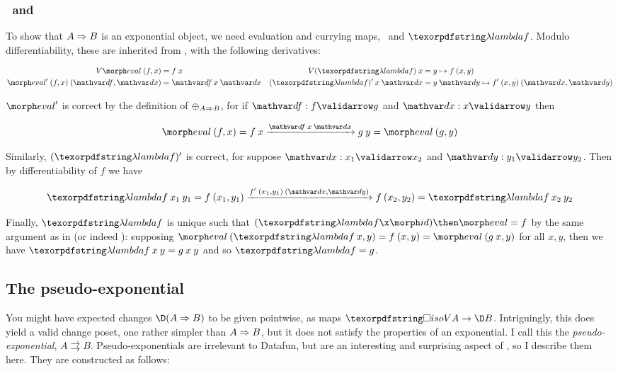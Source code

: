 
\subsubsection{\eval\ and \fn}

To show that $A \Rightarrow B$ is an exponential object, we need evaluation and
currying maps, \eval\ and $\fn f$. Modulo differentiability, these are
inherited from \Poset{}, with the following derivatives:

\begin{align*}
  \vals{\eval} \<(f,x) &= f\<x &
  \vals{(\fn f)} \<x &= y \mapsto f\<(x,y)\\
  \deriv{\eval} \<(f,x) \<(\df,\dx) &= \df \<x \<\dx &
  \deriv{(\fn f)} \<x \<\dx &= y\<\dy \mapsto \deriv f \<(x,y) \<(\dx,\dy)
\end{align*}

\noindent
$\deriv{\eval}$ is correct by the definition of ${\mathbin{\oplus}}_{A \Rightarrow B}$, for if
$\valid\df f g$ and $\valid\dx x y$ then

\nopagebreak[2]
\[ \eval\<(f,x) = {f\<x} \longvalidarrow{\df\<x\<\dx} {g\<y} = \eval\<(g,y) \]

\noindent
Similarly, \(\deriv{(\fn f)}\) is correct, for suppose $\valid\dx {x_1}{x_2}$
and $\valid\dy{y_1}{y_2}$. Then by differentiability of $f$ we have

\nopagebreak[2]
\[ \fn f \<x_1 \<y_1 =
f\<(x_1,y_1) \longvalidarrow{\deriv f \<(x_1,y_1) \<(\dx,\dy)} f\<(x_2,y_2)
= \fn f \<x_2 \<y_2
\]

\noindent
Finally, $\fn f$ is unique such that $(\fn f \x \id) \then \eval = f$ by the
same argument as in \Poset{} (or indeed ): supposing $\eval \<(\fn f
\<x, y) = f\<(x,y) = \eval\<(g\<x,y)$ for all $x,y$, then we have $\fn f \<x \<
y = g \<x \<y$ and so $\fn f = g$.


\subsection{The pseudo-exponential}

\newcommand\pseudoexp{\rightrightarrows}

You might have expected changes $\chgs{(\expO A B)}$ to be given pointwise, as
maps $\isof{\vals A} \to \chgs B$. Intriguingly, this does yield a valid change
poset, one rather simpler than $A \Rightarrow B$, but it does not satisfy the
properties of an exponential. I call this the \emph{pseudo-exponential}, $A
\pseudoexp B$. Pseudo-exponentials are irrelevant to Datafun, but are an
interesting and surprising aspect of \CP, so I describe them here. They are
constructed as follows:

